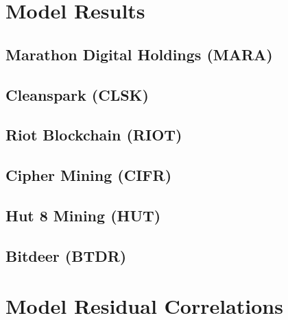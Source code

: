 \documentclass[]{article}
\begin{document}
\pagebreak

\section{Model Results}

\subsection{Marathon Digital Holdings (MARA)}



\pagebreak

\subsection{Cleanspark (CLSK)}



\pagebreak

\subsection{Riot Blockchain (RIOT)}



\pagebreak

\subsection{Cipher Mining (CIFR)}



\pagebreak

\subsection{Hut 8 Mining (HUT)}



\pagebreak

\subsection{Bitdeer (BTDR)}



\pagebreak

\section{Model Residual Correlations}
\end{document}
